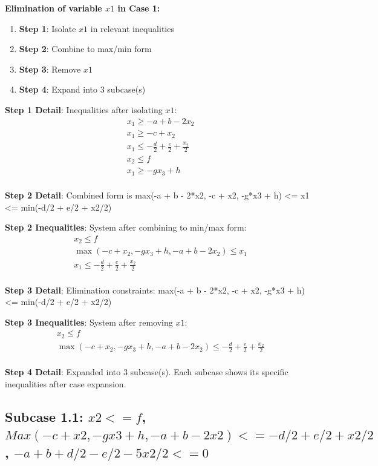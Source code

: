 \documentclass{article}
\begin{document}
\textbf{Elimination of variable $x1$ in Case 1:}

\begin{enumerate}
\item \textbf{Step 1}: Isolate $x1$ in relevant inequalities
\item \textbf{Step 2}: Combine to max/min form
\item \textbf{Step 3}: Remove $x1$
\item \textbf{Step 4}: Expand into 3 subcase(s)
\end{enumerate}

\textbf{Step 1 Detail}: Inequalities after isolating $x1$:
\begin{align}
& x_{1} \geq - a + b - 2 x_{2} \\
& x_{1} \geq - c + x_{2} \\
& x_{1} \leq - \frac{d}{2} + \frac{e}{2} + \frac{x_{2}}{2} \\
& x_{2} \leq f \\
& x_{1} \geq - g x_{3} + h \\
\end{align}

\textbf{Step 2 Detail}: Combined form is max(-a + b - 2*x2, -c + x2, -g*x3 + h) <= x1 <= min(-d/2 + e/2 + x2/2)

\textbf{Step 2 Inequalities}: System after combining to min/max form:
\begin{align}
& x_{2} \leq f \\
& \max\left(- c + x_{2}, - g x_{3} + h, - a + b - 2 x_{2}\right) \leq x_{1} \\
& x_{1} \leq - \frac{d}{2} + \frac{e}{2} + \frac{x_{2}}{2} \\
\end{align}

\textbf{Step 3 Detail}: Elimination constraints:
\quad max(-a + b - 2*x2, -c + x2, -g*x3 + h) <= min(-d/2 + e/2 + x2/2)

\textbf{Step 3 Inequalities}: System after removing $x1$:
\begin{align}
& x_{2} \leq f \\
& \max\left(- c + x_{2}, - g x_{3} + h, - a + b - 2 x_{2}\right) \leq - \frac{d}{2} + \frac{e}{2} + \frac{x_{2}}{2} \\
\end{align}

\textbf{Step 4 Detail}: Expanded into 3 subcase(s).
Each subcase shows its specific inequalities after case expansion.

\subsection{Subcase 1.1: $x2 <= f$, $Max(-c + x2, -g x3 + h, -a + b - 2 x2) <= -d/2 + e/2 + x2/2$, $-a + b + d/2 - e/2 - 5 x2/2 <= 0$}
\end{document}
